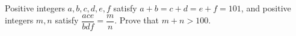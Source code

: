 Positive integers $a,b,c,d,e,f$ satisfy $a+b=c+d=e+f=101$, and positive integers $m,n$ satisfy $\dfrac{ace}{bdf}=\dfrac {m}{n}$. Prove that $m+n>100$.
